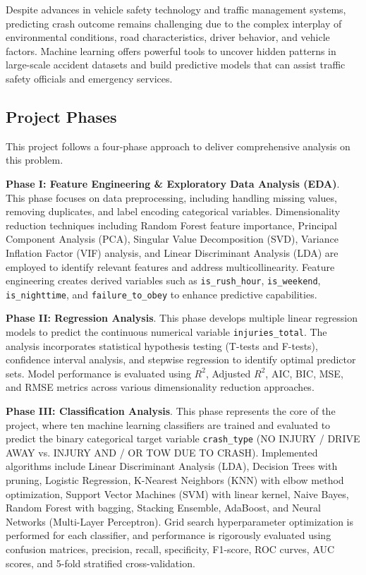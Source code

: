\documentclass[stu,12pt,floatsintext]{apa7}
\begin{document}
Despite advances in vehicle safety technology and traffic management systems, predicting crash outcome remains challenging due to the complex interplay of environmental conditions, 
road characteristics, driver behavior, and vehicle factors. Machine learning offers powerful tools to uncover hidden patterns in large-scale accident datasets and build predictive models
that can assist traffic safety officials and emergency services.

\subsection{Project Phases}

This project follows a four-phase approach to deliver comprehensive analysis on this problem.

\textbf{Phase I: Feature Engineering \& Exploratory Data Analysis (EDA)}. This phase focuses on data preprocessing, including handling missing values, removing duplicates, 
and label encoding categorical variables. Dimensionality reduction techniques including Random Forest feature importance, Principal Component Analysis (PCA), 
Singular Value Decomposition (SVD), Variance Inflation Factor (VIF) analysis, and Linear Discriminant Analysis (LDA) are employed to identify relevant features and address 
multicollinearity. Feature engineering creates derived variables such as \texttt{is\_rush\_hour}, \texttt{is\_weekend}, \texttt{is\_nighttime}, and \texttt{failure\_to\_obey} 
to enhance predictive capabilities.

\textbf{Phase II: Regression Analysis}. This phase develops multiple linear regression models to predict the continuous numerical variable \texttt{injuries\_total}. 
The analysis incorporates statistical hypothesis testing (T-tests and F-tests), confidence interval analysis, and stepwise regression to identify optimal predictor sets. 
Model performance is evaluated using $R^2$, Adjusted $R^2$, AIC, BIC, MSE, and RMSE metrics across various dimensionality reduction approaches.

\textbf{Phase III: Classification Analysis}. This phase represents the core of the project, where ten machine learning classifiers are trained and evaluated to predict 
the binary categorical target variable \texttt{crash\_type} (NO INJURY / DRIVE AWAY vs. INJURY AND / OR TOW DUE TO CRASH). Implemented algorithms include Linear Discriminant 
Analysis (LDA), Decision Trees with pruning, Logistic Regression, K-Nearest Neighbors (KNN) with elbow method optimization, Support Vector Machines (SVM) with linear kernel, 
Naive Bayes, Random Forest with bagging, Stacking Ensemble, AdaBoost, and Neural Networks (Multi-Layer Perceptron). Grid search hyperparameter optimization is performed for 
each classifier, and performance is rigorously evaluated using confusion matrices, precision, recall, specificity, F1-score, ROC curves, AUC scores, and 5-fold stratified cross-validation.
\end{document}
